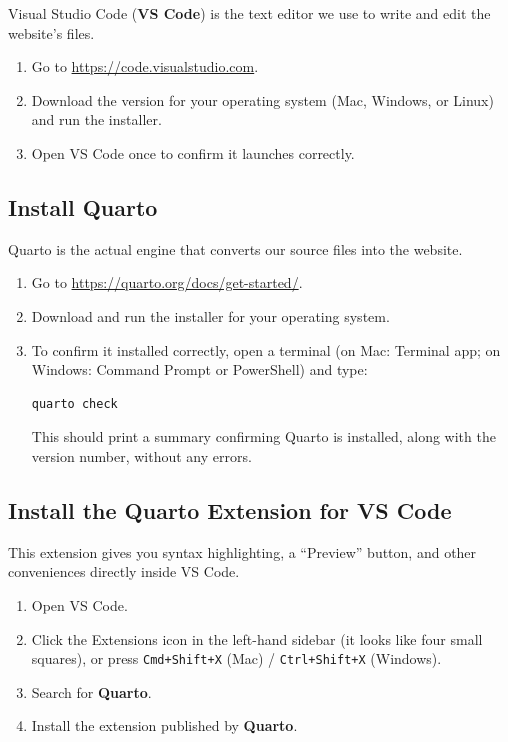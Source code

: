 \documentclass[11pt]{article}
\newcommand{\term}[1]{\textbf{#1}}
\newcommand{\cmd}[1]{\texttt{#1}}
\begin{document}
Visual Studio Code (\term{VS Code}) is the text editor we use to write and
edit the website's files.

\begin{enumerate}
    \item Go to \url{https://code.visualstudio.com}.
    \item Download the version for your operating system (Mac, Windows, or
    Linux) and run the installer.
    \item Open VS Code once to confirm it launches correctly.
\end{enumerate}

\subsection{Install Quarto}

Quarto is the actual engine that converts our source files into the website.

\begin{enumerate}
    \item Go to \url{https://quarto.org/docs/get-started/}.
    \item Download and run the installer for your operating system.
    \item To confirm it installed correctly, open a terminal (on Mac:
    Terminal app; on Windows: Command Prompt or PowerShell) and type:
\begin{lstlisting}
quarto check
\end{lstlisting}
    This should print a summary confirming Quarto is installed, along with
    the version number, without any errors.
\end{enumerate}

\subsection{Install the Quarto Extension for VS Code}

This extension gives you syntax highlighting, a ``Preview'' button, and other
conveniences directly inside VS Code.

\begin{enumerate}
    \item Open VS Code.
    \item Click the Extensions icon in the left-hand sidebar (it looks like
    four small squares), or press \cmd{Cmd+Shift+X} (Mac) / \cmd{Ctrl+Shift+X}
    (Windows).
    \item Search for \term{Quarto}.
    \item Install the extension published by \term{Quarto}.
\end{enumerate}
\end{document}
